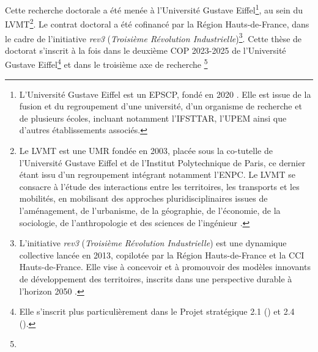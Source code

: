 Cette recherche doctorale a été menée à l'Université Gustave Eiffel\footnote{
    L’Université Gustave Eiffel est un \acrfull{EPSCP}, fondé en 2020 \textcolor{blue}{\autocite{universite_gustave_eiffel_notre_2024}}. Elle est issue de la fusion et du regroupement d’une université, d’un organisme de recherche et de plusieurs écoles, incluant notamment l’\acrfull{IFSTTAR}, l’\acrfull{UPEM} ainsi que d’autres établissements associés.
}, au sein du \acrfull{LVMT}\footnote{
    Le \acrfull{LVMT} est une \acrfull{UMR} fondée en 2003, placée sous la co-tutelle de l’Université Gustave Eiffel et de l’Institut Polytechnique de Paris, ce dernier étant issu d’un regroupement intégrant notamment l’\acrfull{ENPC}. Le \acrshort{LVMT} se consacre à l’étude des interactions entre les territoires, les transports et les mobilités, en mobilisant des approches pluridisciplinaires issues de l’aménagement, de l’urbanisme, de la géographie, de l’économie, de la sociologie, de l’anthropologie et des sciences de l’ingénieur \textcolor{blue}{\autocite{laboratoire_ville_mobilite_transport_presentation_2024}}.
}. Le contrat doctoral a été cofinancé par la Région Hauts-de-France, dans le cadre de l'initiative \textsl{rev3} (\textsl{Troisième Révolution Industrielle})\footnote{
    L’initiative \textsl{rev3} (\textsl{Troisième Révolution Industrielle}) est une dynamique collective lancée en 2013, copilotée par la Région Hauts-de-France et la \acrfull{CCI} Hauts-de-France. Elle vise à concevoir et à promouvoir des modèles innovants de développement des territoires, inscrits dans une perspective durable à l’horizon 2050 \textcolor{blue}{\autocite{rev3_rev3_2022}}.
}. Cette thèse de doctorat s'inscrit à la fois dans le deuxième \acrfull{COP} 2023-2025 de l'Université Gustave Eiffel\footnote{
    Elle s'inscrit plus particulièrement dans le Projet stratégique 2.1 () et 2.4 ().
} et dans le troisième axe de recherche \footnote{
}
